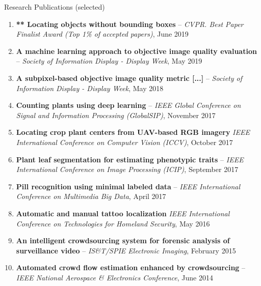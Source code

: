 \documentclass{resume} %
\begin{document}
\begin{rSection}{Research Publications (selected)}

\footnotesize
\begin{enumerate}
\setlength{\itemindent}{-.1in}
\item 
\textbf{** Locating objects without bounding boxes} -- \emph{CVPR. Best Paper Finalist Award (Top 1\% of accepted papers)}, June 2019
\item 
\textbf{A machine learning approach to objective image quality evaluation} -- \emph{Society of Information Display - Display Week}, May 2019
\item 
    \textbf{A subpixel-based objective image quality metric [...]} -- \emph{Society of Information Display - Display Week}, May 2018
\item 
\textbf{Counting plants using deep learning} -- \emph{IEEE Global Conference on Signal and Information Processing (GlobalSIP)}, November 2017
\item 
\textbf{Locating crop plant centers from UAV-based RGB imagery} \emph{IEEE International Conference on Computer Vision (ICCV)}, October 2017
\item 
\textbf{Plant leaf segmentation for estimating phenotypic traits} -- \emph{IEEE International Conference on Image Processing (ICIP)}, September 2017
\item 
\textbf{Pill recognition using minimal labeled data} -- \emph{IEEE International Conference on Multimedia Big Data}, April 2017 %
\item 
\textbf{Automatic and manual tattoo localization} \emph{IEEE International Conference on Technologies for Homeland Security}, May 2016 %
\item 
\textbf{An intelligent crowdsourcing system for forensic analysis of surveillance video} -- \emph{IS\&T/SPIE Electronic Imaging}, February 2015
\item 
\textbf{Automated crowd flow estimation enhanced by crowdsourcing} -- \emph{IEEE National Aerospace \& Electronics Conference}, June 2014 %
\end{enumerate}

\vspace{-5pt}

\end{rSection}
\end{document}
